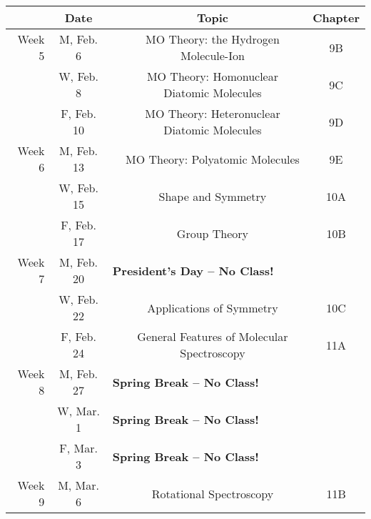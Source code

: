 \documentclass[12pt, letterpaper]{article}
\begin{document}
\begin{tabular}{rcccc}
	        & Date       &                                                           & Topic                                            & Chapter \\
	\midrule
	Week 5  & M, Feb. 6  &                                                           & MO Theory: the Hydrogen Molecule-Ion             & 9B      \\
	        & W, Feb. 8  &                                                           & MO Theory: Homonuclear Diatomic Molecules        & 9C      \\
	        & F, Feb. 10 &                                                           & MO Theory: Heteronuclear Diatomic Molecules      & 9D      \\
	\midrule
	Week 6  & M, Feb. 13 &                                                           & MO Theory: Polyatomic Molecules                  & 9E      \\
	        & W, Feb. 15 &                                                           & Shape and Symmetry                               & 10A     \\
	        & F, Feb. 17 &                                                           & Group Theory                                     & 10B     \\
	\midrule
	Week 7  & M, Feb. 20 & \multicolumn{3}{l}{\textbf{President's Day -- No Class!}}                                                              \\
	        & W, Feb. 22 &                                                           & Applications of Symmetry                         & 10C     \\
	        & F, Feb. 24 &                                                           & General Features of Molecular Spectroscopy       & 11A     \\
	\midrule
	Week 8  & M, Feb. 27 & \multicolumn{3}{l}{\textbf{Spring Break -- No Class!}}                                                                 \\
	        & W, Mar. 1  & \multicolumn{3}{l}{\textbf{Spring Break -- No Class!}}                                                                 \\
	        & F, Mar. 3  & \multicolumn{3}{l}{\textbf{Spring Break -- No Class!}}                                                                 \\
	\midrule
	Week 9  & M, Mar. 6  &                                                           & Rotational Spectroscopy                          & 11B     \\

\end{tabular}
\end{document}
